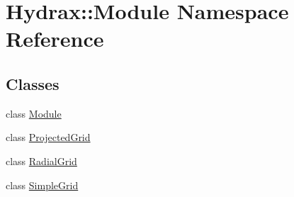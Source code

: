 \hypertarget{namespace_hydrax_1_1_module}{
\section{Hydrax::Module Namespace Reference}
\label{namespace_hydrax_1_1_module}
}
\subsection*{Classes}
\begin{CompactItemize}
\item 
class \hyperlink{class_hydrax_1_1_module_1_1_module}{Module}
\item 
class \hyperlink{class_hydrax_1_1_module_1_1_projected_grid}{ProjectedGrid}
\item 
class \hyperlink{class_hydrax_1_1_module_1_1_radial_grid}{RadialGrid}
\item 
class \hyperlink{class_hydrax_1_1_module_1_1_simple_grid}{SimpleGrid}
\end{CompactItemize}
